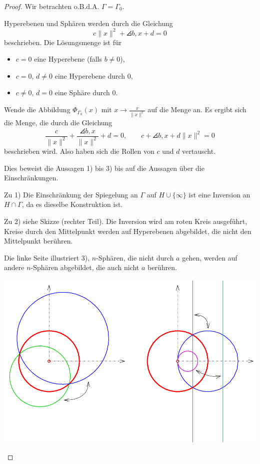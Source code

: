 \begin{proof}
  Wir betrachten o.B.d.A. $\Gamma = \Gamma_0$.

  Hyperebenen und Sphären werden durch die Gleichung
  \[ c \| x \|^2 + \angles{b,x} + d = 0 \]
  beschrieben. Die Lösungsmenge ist für
  \begin{itemize}
    \item $c = 0$ eine Hyperebene (falls $b \ne 0$),
    \item $c = 0$, $d \ne 0$ eine Hyperebene durch 0,
    \item $c \ne 0$, $d = 0$ eine Sphäre durch 0.
  \end{itemize}
  Wende die Abbildung $\Phi_{\Gamma_0}(x)$ mit $x \to \frac{x}{\|x\|^2}$ auf die Menge an. Es ergibt sich die Menge, die durch die Gleichung 
  \[ \frac{c}{\| x \|^2} + \frac{\angles{b,x}}{\| x \|^2} + d = 0, \qquad c + \angles{b,x} + d \| x \|^2 = 0 \]
  beschrieben wird. Also haben sich die Rollen von $c$ und $d$ vertauscht.

  Dies beweist die Aussagen 1) bis 3) bis auf die Aussagen über die
  Einschränkungen.

  Zu 1) Die Einschränkung der Spiegelung an $\Gamma$ auf $H \cup \{ \infty \}$
  ist eine Inversion an $H \cap \Gamma$, da es dieselbe Konstruktion ist.
  
  Zu 2) siehe Skizze (rechter Teil). Die Inversion wird am roten Kreis
  ausgeführt, Kreise durch den Mittelpunkt werden auf Hyperebenen abgebildet,
  die nicht den Mittelpunkt berühren.
  
  Die linke Seite illustriert 3), $n$-Sphären, die nicht durch $a$ gehen, werden
  auf andere $n$-Sphären abgebildet, die auch nicht $a$ berühren.
  
  \begin{center}
    \includegraphics[width=.75\textwidth]{img/Inv-kreis-gerade}
  \end{center}


\end{proof}
